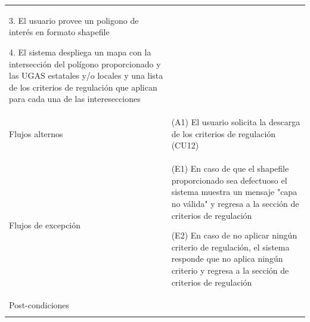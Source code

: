 \begin{longtable}{@{\extracolsep{8pt}}l p{8.5cm}}
 3. El usuario provee un poligono de interés en formato shapefile \par\vspace{.1cm}

 4. El sistema despliega un mapa con la intersección del polígono proporcionado y las UGAS estatales y/o locales y una lista de los criterios de regulación que aplican para cada una de las interesecciones \par\vspace{.1cm}

\\

\hspace{.2cm}Flujos alternos & 
\par (A1) El usuario solicita la descarga de los criterios de regulación (CU12)



\\

\hspace{.2cm}Flujos de excepción & 
\par\vspace{.1cm} (E1) En caso de que el shapefile proporcionado sea defectuoso el sistema muestra un mensaje "capa no válida" y regresa a la sección de criterios de regulación 

\par\vspace{.1cm} (E2) En caso de no aplicar ningún criterio de regulación, el sistema responde que no aplica ningún criterio y regresa a la sección de criterios de regulación


\\%

\hspace{.2cm}Post-condiciones & 
\\
\hline

 \\
\end{longtable}
\endgroup


\pagebreak




